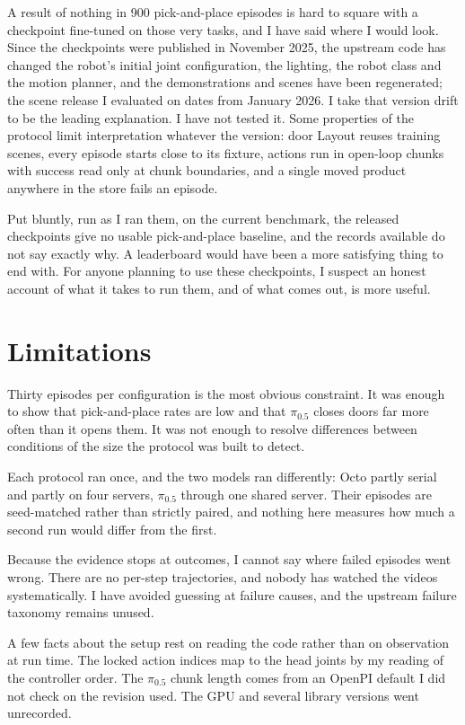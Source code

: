 A result of nothing in 900 pick-and-place episodes is hard to square with a checkpoint fine-tuned on those very tasks, and I have said where I would look. Since the checkpoints were published in November 2025, the upstream code has changed the robot's initial joint configuration, the lighting, the robot class and the motion planner, and the demonstrations and scenes have been regenerated; the scene release I evaluated on dates from January 2026. I take that version drift to be the leading explanation. I have not tested it. Some properties of the protocol limit interpretation whatever the version: door Layout reuses training scenes, every episode starts close to its fixture, actions run in open-loop chunks with success read only at chunk boundaries, and a single moved product anywhere in the store fails an episode.

Put bluntly, run as I ran them, on the current benchmark, the released checkpoints give no usable pick-and-place baseline, and the records available do not say exactly why. A leaderboard would have been a more satisfying thing to end with. For anyone planning to use these checkpoints, I suspect an honest account of what it takes to run them, and of what comes out, is more useful.

\section{Limitations}

Thirty episodes per configuration is the most obvious constraint. It was enough to show that pick-and-place rates are low and that $\pi_{0.5}$ closes doors far more often than it opens them. It was not enough to resolve differences between conditions of the size the protocol was built to detect.

Each protocol ran once, and the two models ran differently: Octo partly serial and partly on four servers, $\pi_{0.5}$ through one shared server. Their episodes are seed-matched rather than strictly paired, and nothing here measures how much a second run would differ from the first.

Because the evidence stops at outcomes, I cannot say where failed episodes went wrong. There are no per-step trajectories, and nobody has watched the videos systematically. I have avoided guessing at failure causes, and the upstream failure taxonomy remains unused.

A few facts about the setup rest on reading the code rather than on observation at run time. The locked action indices map to the head joints by my reading of the controller order. The $\pi_{0.5}$ chunk length comes from an OpenPI default I did not check on the revision used. The GPU and several library versions went unrecorded.

